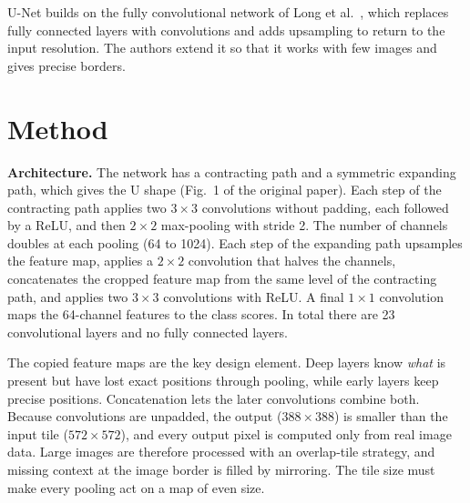 \documentclass{article}
\begin{document}
U-Net builds on the fully convolutional network of Long et al.~, which replaces fully connected layers with convolutions and adds upsampling to return to the input resolution. The authors extend it so that it works with few images and gives precise borders.

\section{Method}
\textbf{Architecture.} The network has a contracting path and a symmetric expanding path, which gives the U shape (Fig.~1 of the original paper). Each step of the contracting path applies two $3\times3$ convolutions without padding, each followed by a ReLU, and then $2\times2$ max-pooling with stride 2. The number of channels doubles at each pooling (64 to 1024). Each step of the expanding path upsamples the feature map, applies a $2\times2$ convolution that halves the channels, concatenates the cropped feature map from the same level of the contracting path, and applies two $3\times3$ convolutions with ReLU. A final $1\times1$ convolution maps the 64-channel features to the class scores. In total there are 23 convolutional layers and no fully connected layers.

The copied feature maps are the key design element. Deep layers know \emph{what} is present but have lost exact positions through pooling, while early layers keep precise positions. Concatenation lets the later convolutions combine both. Because convolutions are unpadded, the output ($388\times388$) is smaller than the input tile ($572\times572$), and every output pixel is computed only from real image data. Large images are therefore processed with an overlap-tile strategy, and missing context at the image border is filled by mirroring. The tile size must make every pooling act on a map of even size.
\end{document}
